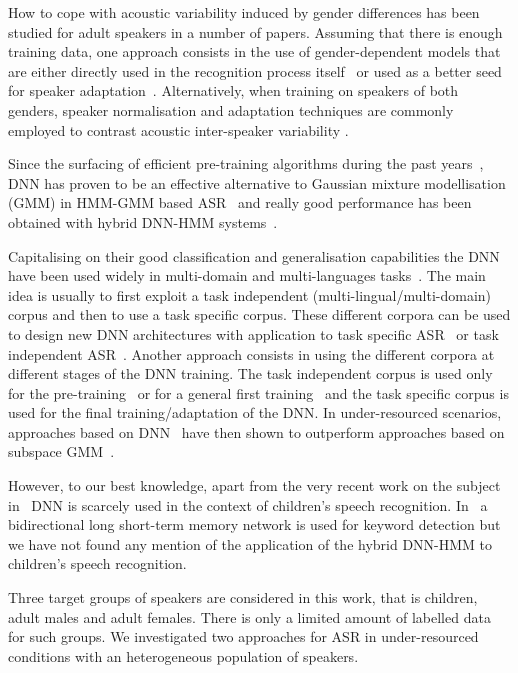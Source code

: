 \documentclass{nle}
\begin{document}
How to  cope with acoustic  variability induced by  gender differences
has been studied  for adult speakers in a  number of papers.  Assuming
that there is enough training  data, one  approach  consists in  the use  of
gender-dependent  models   that  are  either  directly   used  in  the
recognition process itself~\citep*{YocMor92,WooOdeValYou94} or used as a
better  seed for  speaker  adaptation~\citep*{LeeGau93}.  Alternatively,
when training  on speakers of both genders,  speaker normalisation and
adaptation  techniques  are  commonly  employed to  contrast  acoustic
inter-speaker variability \citep*{LeeRos96,Gal98}.

Since the  surfacing of  efficient pre-training algorithms  during the
past years~\citep*{hinton06,bengio07,erhan10,seide11}, DNN has proven to
be an  effective alternative to  Gaussian  mixture modellisation
(GMM) in  HMM-GMM based ASR~\citep*{bourlard94,hinton12} and  really good
performance    has     been    obtained    with     hybrid    DNN-HMM
systems~\citep*{dahl12,mohamed12}.

Capitalising  on their good  classification and  generalisation capabilities
the  DNN have  been used  widely in  multi-domain  and multi-languages
tasks~\citep*{sivadas04,stolcke06}.  The  main idea is  usually to first
exploit  a task  independent  (multi-lingual/multi-domain) corpus  and
then to  use a task specific  corpus.  These different  corpora can be
used to design new DNN architectures with application to task specific
ASR~\citep*{pinto09}  or  task  independent ASR~\citep*{bell13}.   Another
approach consists in using the different corpora at different stages of
the DNN  training. The  task independent corpus  is used only  for the
pre-training~\citep*{swietojanski12}      or       for      a  general    first
training~\citep*{vietbac10,thomas13} and the task specific corpus is used
for  the  final  training/adaptation  of the  DNN.   In  under-resourced
scenarios, approaches based on  DNN~\citep*{imseng13} have then shown to
outperform approaches based on  subspace GMM~\citep*{burget13}.

However, to our best knowledge, apart from the very recent work on the
subject in~\citet*{MatChe2014}  DNN is scarcely  used in the  context of
children's  speech recognition.   In~\citet*{Wollmer11}  a bidirectional
long short-term  memory network is  used for keyword detection  but we
have not found any mention of the application of the hybrid DNN-HMM to
children's speech recognition.

Three target groups  of speakers are considered in  this work, that is
children,  adult males  and adult  females.  There  is only  a limited
amount  of  labelled  data  for  such  groups.   We  investigated  two
approaches for ASR in under-resourced conditions with an heterogeneous
population of speakers.
\end{document}
